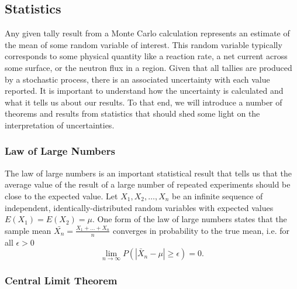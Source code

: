 \subsection{Statistics}

Any given tally result from a Monte Carlo calculation represents an estimate of
the mean of some random variable of interest. This random variable typically
corresponds to some physical quantity like a reaction rate, a net current across
some surface, or the neutron flux in a region. Given that all tallies are
produced by a stochastic process, there is an associated uncertainty with each
value reported. It is important to understand how the uncertainty is calculated
and what it tells us about our results. To that end, we will introduce a number
of theorems and results from statistics that should shed some light on the
interpretation of uncertainties.

\subsubsection{Law of Large Numbers}

The law of large numbers is an important statistical result that tells us that
the average value of the result of a large number of repeated experiments should
be close to the expected value. Let $X_1, X_2, \dots, X_n$ be an infinite
sequence of independent, identically-distributed random variables with expected
values $E(X_1) = E(X_2) = \mu$. One form of the law of large numbers states that
the sample mean $\bar{X_n} = \frac{X_1 + \dots + X_n}{n}$ converges in
probability to the true mean, i.e. for all $\epsilon > 0$
\begin{equation}
    \lim\limits_{n\rightarrow\infty} P \left ( \left | \bar{X}_n - \mu \right |
    \ge \epsilon \right ) = 0.
\end{equation}

\subsubsection{Central Limit Theorem}
\label{sec:central-limit-theorem}

